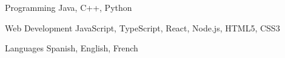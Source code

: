 

\begin{cvskills}

  \cvskill
    {Programming} %
    {Java, C++, Python} %
    
  \cvskill
    {Web Development} %
    {JavaScript, TypeScript, React, Node.js, HTML5, CSS3} %
    
  \cvskill
    {Languages} %
    {Spanish, English, French} %

\end{cvskills}
